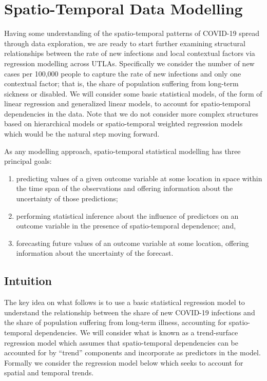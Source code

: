 \documentclass[
]{book}
\begin{document}
\hypertarget{spatio-temporal-data-modelling}{%
\section{Spatio-Temporal Data Modelling}\label{spatio-temporal-data-modelling}}

Having some understanding of the spatio-temporal patterns of COVID-19 spread through data exploration, we are ready to start further examining structural relationships between the rate of new infections and local contextual factors via regression modelling across UTLAs. Specifically we consider the number of new cases per 100,000 people to capture the rate of new infections and only one contextual factor; that is, the share of population suffering from long-term sickness or disabled. We will consider some basic statistical models, of the form of linear regression and generalized linear models, to account for spatio-temporal dependencies in the data. Note that we do not consider more complex structures based on hierarchical models or spatio-temporal weighted regression models which would be the natural step moving forward.

As any modelling approach, spatio-temporal statistical modelling has three principal goals:

\begin{enumerate}
\def\labelenumi{\arabic{enumi}.}
\item
  predicting values of a given outcome variable at some location in space within the time span of the observations and offering information about the uncertainty of those predictions;
\item
  performing statistical inference about the influence of predictors on an outcome variable in the presence of spatio-temporal dependence; and,
\item
  forecasting future values of an outcome variable at some location, offering information about the uncertainty of the forecast.
\end{enumerate}

\hypertarget{intuition}{%
\subsection{Intuition}\label{intuition}}

The key idea on what follows is to use a basic statistical regression model to understand the relationship between the share of new COVID-19 infections and the share of population suffering from long-term illness, accounting for spatio-temporal dependencies. We will consider what is known as a trend-surface regression model which assumes that spatio-temporal dependencies can be accounted for by ``trend'' components and incorporate as predictors in the model. Formally we consider the regression model below which seeks to account for spatial and temporal trends.
\end{document}
